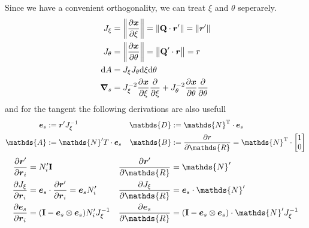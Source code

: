 \documentclass[a4paper,11pt]{article}
\renewcommand{\to}[1]{\text{\boldmath $#1$}} %
\newcommand{\ts}[1]{\text{\boldmath $\mathrm{#1}$}} %
\newcommand{\uv}[1]{\mathds{#1}}
\newcommand{\um}[1]{\mathds{#1}}
\newcommand{\intd}[1]{\mathrm{d}#1}
\newcommand{\pderiv}[2]{\frac{\partial#1}{\partial#2}}
\newcommand{\norm}[1]{\left\lVert{#1}\right\rVert}
\newcommand{\T}{\mathrm{T}}
\newcommand{\defeq}{:=}
\begin{document}
Since we have a convenient orthogonality, we can treat $\xi$ and $\theta$ seperarely.
\begin{align}
 J_\xi &= \norm{\pderiv{\to x}{\xi}} = \norm{\ts Q \cdot \to r'} = \norm{\to r'}\\
 J_\theta &= \norm{\pderiv{\to x}{\theta}} = \norm{\ts Q' \cdot \to r} = r \\
 \intd A &= J_\xi J_\theta \intd \xi \intd \theta \\
 \to\nabla_s &= J_\xi^{-2} \pderiv{\to x}{\xi}\pderiv{}{\xi} + J_\theta^{-2} \pderiv{\to x}{\theta}\pderiv{}{\theta}
\end{align}
and for the tangent the following derivations are also usefull
\begin{align}
 \to e_s &\defeq \to r' J_\xi^{-1} & \uv D &\defeq \um N^\T \cdot \to e_s\\
 \uv A &\defeq {\um N}'^\T \cdot \to e_s & \uv B &\defeq \pderiv{r}{\uv R} = {\um N}^\T \cdot \begin{bmatrix}1\\0\end{bmatrix}\\
\end{align}
\begin{align}
 \pderiv{\to r'}{\to r_i} &= N_i' \ts I
	& \pderiv{\to r'}{\uv R} &= \um N'\\
 \pderiv{J_\xi}{\to r_i} &= \to e_s \cdot \pderiv{\to r'}{\to r_i} = \to e_s N_i'
	& \pderiv{J_\xi}{\uv R} &= \to e_s\cdot \um N' \\
 \pderiv{\to e_s}{\to r_i} &= (\ts I - \to e_s\otimes\to e_s)N_i' J_\xi^{-1}
	& \pderiv{\to e_s}{\uv R} &= (\ts I - \to e_s \otimes \to e_s )\cdot \um N' J_\xi^{-1}
\end{align}
\end{document}
